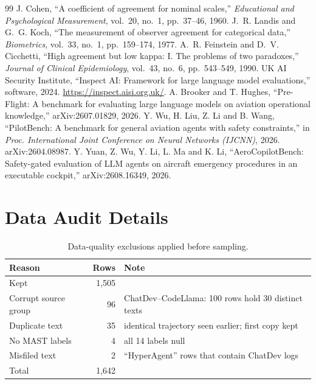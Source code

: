 \documentclass[10pt,a4paper]{article}
\begin{document}
\begin{thebibliography}{99}
 J. Cohen, ``A coefficient of agreement for nominal scales,'' \emph{Educational and Psychological Measurement}, vol.~20, no.~1, pp.~37--46, 1960.
 J.~R. Landis and G.~G. Koch, ``The measurement of observer agreement for categorical data,'' \emph{Biometrics}, vol.~33, no.~1, pp.~159--174, 1977.
 A.~R. Feinstein and D.~V. Cicchetti, ``High agreement but low kappa: I. The problems of two paradoxes,'' \emph{Journal of Clinical Epidemiology}, vol.~43, no.~6, pp.~543--549, 1990.
 UK AI Security Institute, ``Inspect AI: Framework for large language model evaluations,'' software, 2024. \url{https://inspect.aisi.org.uk/}.
 A. Brooker and T. Hughes, ``Pre-Flight: A benchmark for evaluating large language models on aviation operational knowledge,'' arXiv:2607.01829, 2026.
 Y. Wu, H. Liu, Z. Li and B. Wang, ``PilotBench: A benchmark for general aviation agents with safety constraints,'' in \emph{Proc. International Joint Conference on Neural Networks (IJCNN)}, 2026. arXiv:2604.08987.
 Y. Yuan, Z. Wu, Y. Li, L. Ma and K. Li, ``AeroCopilotBench: Safety-gated evaluation of LLM agents on aircraft emergency procedures in an executable cockpit,'' arXiv:2608.16349, 2026.
\end{thebibliography}

\appendix

\section{Data Audit Details}
\label{app:audit}

\begin{table}[tbp]
\centering
\caption{Data-quality exclusions applied before sampling.}
\label{tab:exclusions}
\small
\begin{tabular}{@{}lrl@{}}
\toprule
Reason & Rows & Note\\
\midrule
Kept & 1{,}505 & \\
Corrupt source group & 96 & ChatDev--CodeLlama: 100 rows hold 30 distinct texts\\
Duplicate text & 35 & identical trajectory seen earlier; first copy kept\\
No MAST labels & 4 & all 14 labels null\\
Misfiled text & 2 & ``HyperAgent'' rows that contain ChatDev logs\\
\midrule
Total & 1{,}642 & \\
\bottomrule
\end{tabular}
\end{table}
\end{document}
